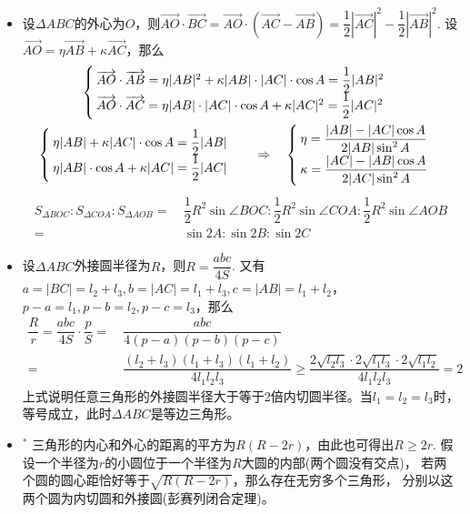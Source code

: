 \begin{itemize}[leftmargin=\inteval{\myitemleftmargin}pt,itemsep=
   \inteval{\myitemitempsep}pt,topsep=\inteval{\myitemtopsep}pt]
\item 设$ \Delta ABC $的外心为$ O $，则$ \vec{AO} \cdot \vec{BC}=
\vec{AO}\cdot (\vec{AC}-\vec{AB})=
\dfrac{1}{2}|\vec{AC}|^2-\dfrac{1}{2}|\vec{AB}|^2. $ 
设$ \vec{AO}=\eta\vec{AB}+\kappa\vec{AC} $，那么 
\begin{gather*}
\begin{cases}
    \overrightarrow{AO}\cdot\overrightarrow{AB}=\eta |AB|^2+\kappa |AB|
    \cdot |AC|\cdot\cos A=\dfrac{1}{2}|AB|^2 \\
    \overrightarrow{AO}\cdot\overrightarrow{AC}=\eta |AB|\cdot |AC|\cdot\cos A+\kappa 
    |AC|^2=\dfrac{1}{2}|AC|^2 
\end{cases} \\
\begin{cases}
    \eta |AB|+\kappa |AC|\cdot\cos A=\dfrac{1}{2}|AB| \\
    \eta |AB|\cdot \cos A+\kappa |AC|=\dfrac{1}{2}|AC| 
\end{cases}\quad \Rightarrow \quad
\begin{cases}
    \eta=\dfrac{|AB|-|AC|\cos A}{2|AB|\sin^2 A} \\
    \kappa=\dfrac{|AC|-|AB|\cos A}{2|AC|\sin^2 A} 
\end{cases}
\end{gather*}
\begin{align*}
    S_{\Delta BOC}:S_{\Delta COA}:S_{\Delta AOB} =&\ \dfrac{1}{2}R^2 
    \sin\angle BOC:\dfrac{1}{2}R^2\sin\angle COA:
    \dfrac{1}{2}R^2\sin\angle AOB \\ =&\ \sin 2A:\sin 2B:\sin 2C
\end{align*}
\item 设$ \Delta ABC $外接圆半径为$ R $，则$ R=\dfrac{abc}{4S} $. 
又有$ a=|BC|=l_2+l_3,b=|AC|=l_1+l_3,c=|AB|=l_1+l_2 $，
$ p-a=l_1,p-b=l_2,p-c=l_3 $，那么
\begin{align*}
    \dfrac{R}{r}=\dfrac{abc}{4S}\cdot \dfrac{p}{S}
    =&\ \dfrac{abc}{4(p-a)(p-b)(p-c)} \\
    =&\ \dfrac{(l_2+l_3)(l_1+l_3)(l_1+l_2)}{4l_1l_2l_3} 
    \geq \dfrac{2\sqrt{l_2l_3}\cdot 2\sqrt{l_1l_3}\cdot 2\sqrt{l_1l_2}}{4l_1l_2l_3}=2
\end{align*}
上式说明任意三角形的外接圆半径大于等于2倍内切圆半径。当$ l_1=l_2=l_3 $时，
等号成立，此时$ \Delta ABC $是等边三角形。

\item $^*$ 三角形的内心和外心的距离的平方为$ R(R-2r) $，由此也可得出$ R\geq 2r $.
假设一个半径为$ r $的小圆位于一个半径为$ R $大圆的内部(两个圆没有交点)，
若两个圆的圆心距恰好等于$ \sqrt{R(R-2r)} $，那么存在无穷多个三角形，
分别以这两个圆为内切圆和外接圆(彭赛列闭合定理)。


\end{itemize}
